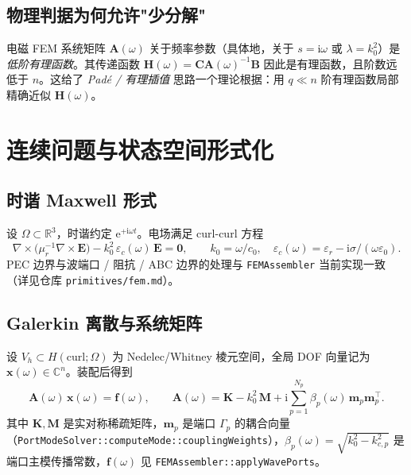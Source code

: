 \documentclass[11pt,a4paper]{ctexart}
\newcommand{\R}{\mathbb{R}}
\newcommand{\C}{\mathbb{C}}
\newcommand{\im}{\mathrm{i}}
\begin{document}
\subsection{物理判据为何允许"少分解"}

电磁 FEM 系统矩阵 $\bm A(\omega)$ 关于频率参数（具体地，关于 $s = \im\omega$ 或 $\lambda = k_0^2$）是\emph{低阶有理函数}。其传递函数 $\bm H(\omega) = \bm C \bm A(\omega)^{-1}\bm B$ 因此是有理函数，且阶数远低于 $n$。这给了 \emph{Padé / 有理插值} 思路一个理论根据：用 $q\ll n$ 阶有理函数局部精确近似 $\bm H(\omega)$。

\section{连续问题与状态空间形式化}

\subsection{时谐 Maxwell 形式}

设 $\Omega\subset\R^3$，时谐约定 $\mathrm{e}^{+\im\omega t}$。电场满足 curl-curl 方程
\begin{equation}
  \nabla\times\!\big(\mu_r^{-1}\nabla\times\bm E\big)
  -k_0^2\,\varepsilon_c(\omega)\,\bm E = \bm 0,\qquad
  k_0=\omega/c_0,\quad \varepsilon_c(\omega)=\varepsilon_r-\im\sigma/(\omega\varepsilon_0).
  \label{eq:strong}
\end{equation}
PEC 边界与波端口 / 阻抗 / ABC 边界的处理与 \texttt{FEMAssembler} 当前实现一致（详见仓库 \texttt{primitives/fem.md}）。

\subsection{Galerkin 离散与系统矩阵}

设 $V_h\subset H(\mathrm{curl};\Omega)$ 为 Nedelec/Whitney 棱元空间，全局 DOF 向量记为 $\bm x(\omega)\in\C^n$。装配后得到
\begin{equation}
  \boxed{\;
  \bm A(\omega)\,\bm x(\omega) = \bm f(\omega),\qquad
  \bm A(\omega) = \bm K - k_0^2\,\bm M
  + \im\sum_{p=1}^{N_p} \beta_p(\omega)\,\bm m_p \bm m_p^{\!\top}.
  \;}
  \label{eq:discrete}
\end{equation}
其中 $\bm K,\bm M$ 是实对称稀疏矩阵，$\bm m_p$ 是端口 $\Gamma_p$ 的耦合向量（\texttt{PortModeSolver::computeMode::couplingWeights}），$\beta_p(\omega)=\sqrt{k_0^2-k_{c,p}^2}$ 是端口主模传播常数，$\bm f(\omega)$ 见 \texttt{FEMAssembler::applyWavePorts}。
\end{document}
